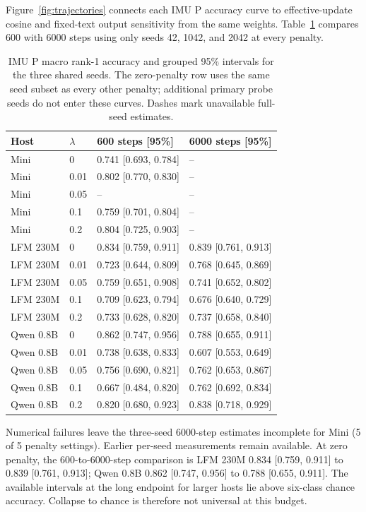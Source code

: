 Figure~\ref{fig:trajectories} connects each IMU P accuracy curve to effective-update cosine and fixed-text output sensitivity from the same weights. Table~\ref{tab:budget-endpoints} compares 600 with 6000 steps using only seeds 42, 1042, and 2042 at every penalty.

\begin{table}[!htbp]\centering\small
\setlength{\tabcolsep}{4pt}
\caption{IMU P macro rank-1 accuracy and grouped 95\% intervals for the three shared seeds. The zero-penalty row uses the same seed subset as every other penalty; additional primary probe seeds do not enter these curves. Dashes mark unavailable full-seed estimates.}\label{tab:budget-endpoints}
\begin{tabular}{@{}llll@{}}
\toprule
Host & $\lambda$ & 600 steps [95\%] & 6000 steps [95\%] \\
\midrule
Mini & 0 & 0.741 [0.693, 0.784] & -- \\
Mini & 0.01 & 0.802 [0.770, 0.830] & -- \\
Mini & 0.05 & -- & -- \\
Mini & 0.1 & 0.759 [0.701, 0.804] & -- \\
Mini & 0.2 & 0.804 [0.725, 0.903] & -- \\
LFM 230M & 0 & 0.834 [0.759, 0.911] & 0.839 [0.761, 0.913] \\
LFM 230M & 0.01 & 0.723 [0.644, 0.809] & 0.768 [0.645, 0.869] \\
LFM 230M & 0.05 & 0.759 [0.651, 0.908] & 0.741 [0.652, 0.802] \\
LFM 230M & 0.1 & 0.709 [0.623, 0.794] & 0.676 [0.640, 0.729] \\
LFM 230M & 0.2 & 0.733 [0.628, 0.820] & 0.737 [0.658, 0.840] \\
Qwen 0.8B & 0 & 0.862 [0.747, 0.956] & 0.788 [0.655, 0.911] \\
Qwen 0.8B & 0.01 & 0.738 [0.638, 0.833] & 0.607 [0.553, 0.649] \\
Qwen 0.8B & 0.05 & 0.756 [0.690, 0.821] & 0.762 [0.653, 0.867] \\
Qwen 0.8B & 0.1 & 0.667 [0.484, 0.820] & 0.762 [0.692, 0.834] \\
Qwen 0.8B & 0.2 & 0.820 [0.680, 0.923] & 0.838 [0.718, 0.929] \\
\bottomrule
\end{tabular}
\end{table}\par


Numerical failures leave the three-seed 6000-step estimates incomplete for Mini (5 of 5 penalty settings). Earlier per-seed measurements remain available. At zero penalty, the 600-to-6000-step comparison is LFM 230M 0.834 [0.759, 0.911] to 0.839 [0.761, 0.913]; Qwen 0.8B 0.862 [0.747, 0.956] to 0.788 [0.655, 0.911]. The available intervals at the long endpoint for larger hosts lie above six-class chance accuracy. Collapse to chance is therefore not universal at this budget.

